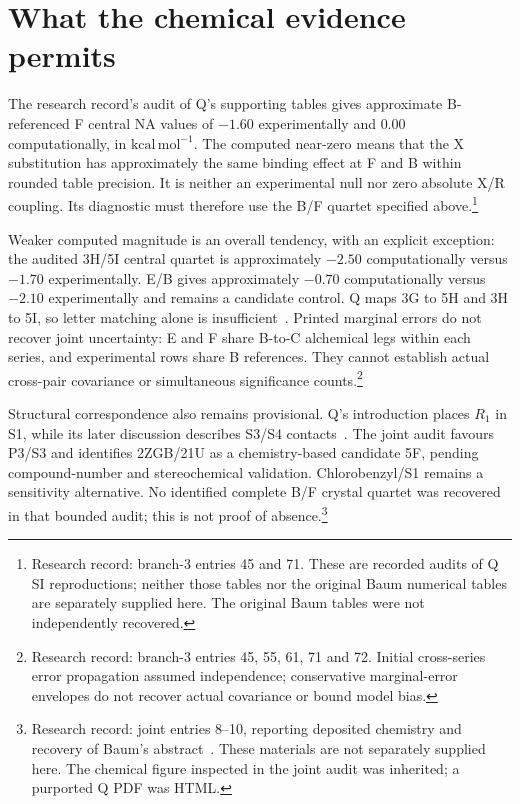 \documentclass{article}
\begin{document}
\section{What the chemical evidence permits}
The research record's audit of Q's supporting tables gives approximate B-referenced F central NA values of \(-1.60\) experimentally and \(0.00\) computationally, in \(\mathrm{kcal\,mol^{-1}}\). The computed near-zero means that the X substitution has approximately the same binding effect at F and B within rounded table precision. It is neither an experimental null nor zero absolute X/R coupling. Its diagnostic must therefore use the B/F quartet specified above.\footnote{Research record: branch-3 entries 45 and 71. These are recorded audits of Q SI reproductions; neither those tables nor the original Baum numerical tables are separately supplied here. The original Baum tables were not independently recovered.}

Weaker computed magnitude is an overall tendency, with an explicit exception: the audited 3H/5I central quartet is approximately \(-2.50\) computationally versus \(-1.70\) experimentally. E/B gives approximately \(-0.70\) computationally versus \(-2.10\) experimentally and remains a candidate control. Q maps 3G to 5H and 3H to 5I, so letter matching alone is insufficient~\cite{Q}. Printed marginal errors do not recover joint uncertainty: E and F share B-to-C alchemical legs within each series, and experimental rows share B references. They cannot establish actual cross-pair covariance or simultaneous significance counts.\footnote{Research record: branch-3 entries 45, 55, 61, 71 and 72. Initial cross-series error propagation assumed independence; conservative marginal-error envelopes do not recover actual covariance or bound model bias.}

Structural correspondence also remains provisional. Q's introduction places \(R_1\) in S1, while its later discussion describes S3/S4 contacts~\cite{Q}. The joint audit favours P3/S3 and identifies 2ZGB/21U as a chemistry-based candidate 5F, pending compound-number and stereochemical validation. Chlorobenzyl/S1 remains a sensitivity alternative. No identified complete B/F crystal quartet was recovered in that bounded audit; this is not proof of absence.\footnote{Research record: joint entries 8--10, reporting deposited chemistry and recovery of Baum's abstract~\cite{Baum}. These materials are not separately supplied here. The chemical figure inspected in the joint audit was inherited; a purported Q PDF was HTML.}
\end{document}
